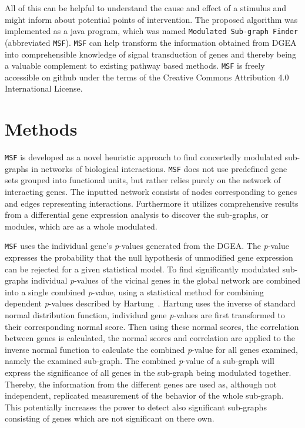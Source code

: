 \documentclass[10pt,a4paper,twocolumn]{article}
\begin{document}
All of this can be helpful to understand the cause and effect of a
stimulus and might inform about potential points of intervention. The
proposed algorithm was implemented as a java program, which was named
\texttt{Modulated Sub-graph Finder} (abbreviated
\texttt{MSF}). \texttt{MSF} can help transform the information
obtained from DGEA into comprehensible knowledge of signal
transduction of genes and thereby being a valuable complement to
existing pathway based methods. \texttt{MSF} is freely accessible on
github under the terms of the Creative Commons Attribution 4.0
International License.

\section*{Methods}
\texttt{MSF} is developed as a novel heuristic approach to find
concertedly modulated sub-graphs in networks of biological
interactions.  \texttt{MSF} does not use predefined gene sets grouped
into functional units, but rather relies purely on the network of
interacting genes.  The inputted network consists of nodes
corresponding to genes and edges representing
interactions. Furthermore it utilizes comprehensive results from a
differential gene expression analysis to discover the sub-graphs, or
modules, which are as a whole modulated.

\texttt{MSF} uses the individual gene's \textit{p}-values generated
from the DGEA. The \textit{p}-value expresses the probability that the
null hypothesis of unmodified gene expression can be rejected for a
given statistical model. To find significantly modulated sub-graphs
individual \textit{p}-values of the vicinal genes in the global
network are combined into a single combined \textit{p}-value, using a
statistical method for combining dependent \textit{p}-values described
by Hartung~\cite{Hartung}. Hartung uses the inverse of standard normal
distribution function, individual gene \textit{p}-values are first
transformed to their corresponding normal score. Then using these
normal scores, the correlation between genes is calculated, the normal
scores and correlation are applied to the inverse normal function to
calculate the combined \textit{p}-value for all genes examined, namely
the examined sub-graph. The combined \textit{p}-value of a sub-graph
will express the significance of all genes in the sub-graph being
modulated together. Thereby, the information from the different genes
are used as, although not independent, replicated measurement of the
behavior of the whole sub-graph. This potentially increases the power
to detect also significant sub-graphs consisting of genes which are
not significant on there own.
\newline
\end{document}
